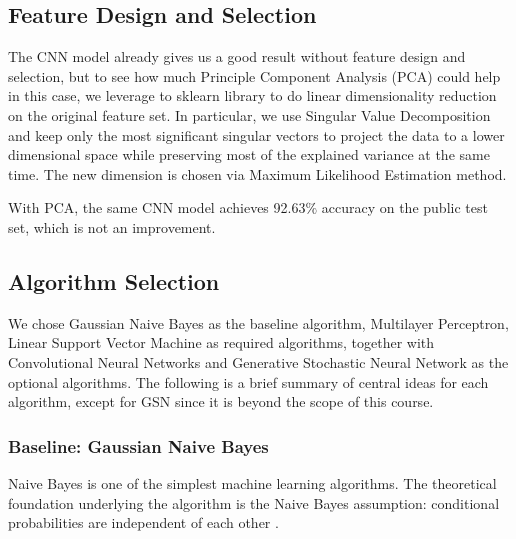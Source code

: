 \documentclass{acm_proc_article-sp}
\begin{document}
\subsection{Feature Design and Selection}
The CNN model already gives us a good result without feature design and selection, but to see how much Principle Component Analysis (PCA) could help in this case, we leverage to sklearn library to do linear dimensionality reduction on the original feature set. In particular, we use Singular Value Decomposition and keep only the most significant singular vectors to project the data to a lower dimensional space while preserving most of the explained variance at the same time. The new dimension is chosen via Maximum Likelihood Estimation method.

With PCA, the same CNN model achieves 92.63$\%$ accuracy on the public test set, which is not an improvement.


 
\subsection{Algorithm Selection}
We chose Gaussian Naive Bayes as the baseline algorithm, Multilayer Perceptron, Linear Support Vector Machine as required algorithms, together with Convolutional Neural Networks and Generative Stochastic Neural Network as the optional algorithms. The following is a brief summary of central ideas for each algorithm, except for GSN since it is beyond the scope of this course.

\subsubsection{Baseline: Gaussian Naive Bayes}
Naive Bayes is one of the simplest machine learning algorithms. The theoretical foundation underlying the algorithm is the Naive Bayes assumption: conditional probabilities are independent of each other \cite{Bishop:2006:PRM:1162264, pineaul5}.
\end{document}
